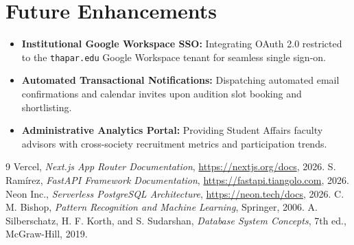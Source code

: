 \documentclass[12pt,a4paper]{report}
\begin{document}
\section{Future Enhancements}
\begin{itemize}[noitemsep]
    \item \textbf{Institutional Google Workspace SSO:} Integrating OAuth 2.0 restricted to the \texttt{thapar.edu} Google Workspace tenant for seamless single sign-on.
    \item \textbf{Automated Transactional Notifications:} Dispatching automated email confirmations and calendar invites upon audition slot booking and shortlisting.
    \item \textbf{Administrative Analytics Portal:} Providing Student Affairs faculty advisors with cross-society recruitment metrics and participation trends.
\end{itemize}

\begin{thebibliography}{9}
 Vercel, \textit{Next.js App Router Documentation}, \url{https://nextjs.org/docs}, 2026.
 S. Ram\'irez, \textit{FastAPI Framework Documentation}, \url{https://fastapi.tiangolo.com}, 2026.
 Neon Inc., \textit{Serverless PostgreSQL Architecture}, \url{https://neon.tech/docs}, 2026.
 C. M. Bishop, \textit{Pattern Recognition and Machine Learning}, Springer, 2006.
 A. Silberschatz, H. F. Korth, and S. Sudarshan, \textit{Database System Concepts}, 7th ed., McGraw-Hill, 2019.
\end{thebibliography}
\end{document}
